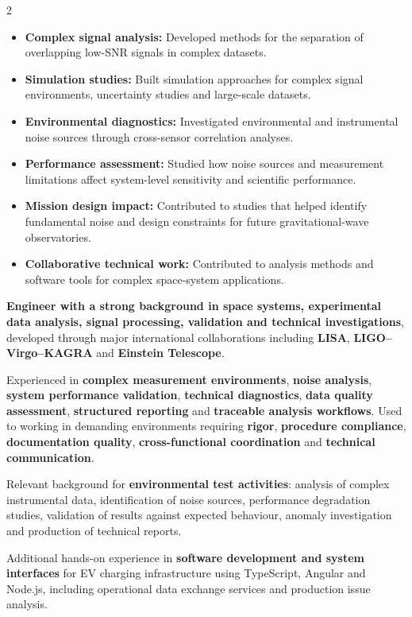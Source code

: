\documentclass[8pt,a4paper,ragged2e,withhyper]{../_shared/altacv}
\begin{document}
\begin{paracol}{2}
\begin{itemize}
\item \textbf{Complex signal analysis:} Developed methods for the separation of overlapping low-SNR signals in complex datasets.
\item \textbf{Simulation studies:} Built simulation approaches for complex signal environments, uncertainty studies and large-scale datasets.
\item \textbf{Environmental diagnostics:} Investigated environmental and instrumental noise sources through cross-sensor correlation analyses.
\item \textbf{Performance assessment:} Studied how noise sources and measurement limitations affect system-level sensitivity and scientific performance.
\item \textbf{Mission design impact:} Contributed to studies that helped identify fundamental noise and design constraints for future gravitational-wave observatories.
\item \textbf{Collaborative technical work:} Contributed to analysis methods and software tools for complex space-system applications.
\end{itemize}

\switchcolumn


\textbf{Engineer with a strong background in space systems, experimental data analysis, signal processing, validation and technical investigations}, developed through major international collaborations including \textbf{LISA}, \textbf{LIGO--Virgo--KAGRA} and \textbf{Einstein Telescope}.

Experienced in \textbf{complex measurement environments}, \textbf{noise analysis}, \textbf{system performance validation}, \textbf{technical diagnostics}, \textbf{data quality assessment}, \textbf{structured reporting} and \textbf{traceable analysis workflows}. Used to working in demanding environments requiring \textbf{rigor}, \textbf{procedure compliance}, \textbf{documentation quality}, \textbf{cross-functional coordination} and \textbf{technical communication}.

Relevant background for \textbf{environmental test activities}: analysis of complex instrumental data, identification of noise sources, performance degradation studies, validation of results against expected behaviour, anomaly investigation and production of technical reports.

Additional hands-on experience in \textbf{software development and system interfaces} for EV charging infrastructure using TypeScript, Angular and Node.js, including operational data exchange services and production issue analysis.


\end{paracol}
\end{document}
